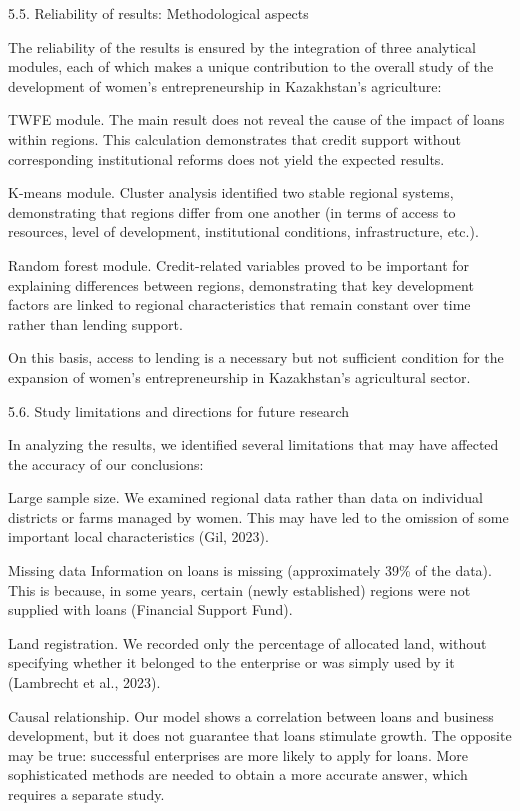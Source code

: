 \documentclass[
]{article}
\begin{document}
5.5. Reliability of results: Methodological aspects

The reliability of the results is ensured by the integration of three
analytical modules, each of which makes a unique contribution to the
overall study of the development of women's entrepreneurship in
Kazakhstan's agriculture:

TWFE module. The main result does not reveal the cause of the impact of
loans within regions. This calculation demonstrates that credit support
without corresponding institutional reforms does not yield the expected
results.

K-means module. Cluster analysis identified two stable regional systems,
demonstrating that regions differ from one another (in terms of access
to resources, level of development, institutional conditions,
infrastructure, etc.).

Random forest module. Credit-related variables proved to be important
for explaining differences between regions, demonstrating that key
development factors are linked to regional characteristics that remain
constant over time rather than lending support.

On this basis, access to lending is a necessary but not sufficient
condition for the expansion of women's entrepreneurship in Kazakhstan's
agricultural sector.

5.6. Study limitations and directions for future research

In analyzing the results, we identified several limitations that may
have affected the accuracy of our conclusions:

Large sample size. We examined regional data rather than data on
individual districts or farms managed by women. This may have led to the
omission of some important local characteristics (Gil, 2023).

Missing data Information on loans is missing (approximately 39\% of the
data). This is because, in some years, certain (newly established)
regions were not supplied with loans (Financial Support Fund).

Land registration. We recorded only the percentage of allocated land,
without specifying whether it belonged to the enterprise or was simply
used by it (Lambrecht et al., 2023).

Causal relationship. Our model shows a correlation between loans and
business development, but it does not guarantee that loans stimulate
growth. The opposite may be true: successful enterprises are more likely
to apply for loans. More sophisticated methods are needed to obtain a
more accurate answer, which requires a separate study.
\end{document}

